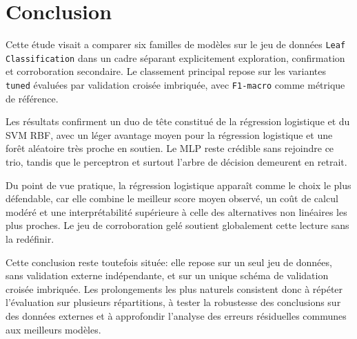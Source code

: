 \section{Conclusion}

Cette étude visait a comparer six familles de modèles sur le jeu de données \texttt{Leaf Classification} dans un cadre séparant explicitement exploration, confirmation et corroboration secondaire. Le classement principal repose sur les variantes \texttt{tuned} évaluées par validation croisée imbriquée, avec \texttt{F1-macro} comme métrique de référence.

Les résultats confirment un duo de tête constitué de la régression logistique et du SVM RBF, avec un léger avantage moyen pour la régression logistique et une forêt aléatoire très proche en soutien. Le MLP reste crédible sans rejoindre ce trio, tandis que le perceptron et surtout l'arbre de décision demeurent en retrait.

Du point de vue pratique, la régression logistique apparaît comme le choix le plus défendable, car elle combine le meilleur score moyen observé, un coût de calcul modéré et une interprétabilité supérieure à celle des alternatives non linéaires les plus proches. Le jeu de corroboration gelé soutient globalement cette lecture sans la redéfinir.

Cette conclusion reste toutefois située: elle repose sur un seul jeu de données, sans validation externe indépendante, et sur un unique schéma de validation croisée imbriquée. Les prolongements les plus naturels consistent donc à répéter l'évaluation sur plusieurs répartitions, à tester la robustesse des conclusions sur des données externes et à approfondir l'analyse des erreurs résiduelles communes aux meilleurs modèles.

